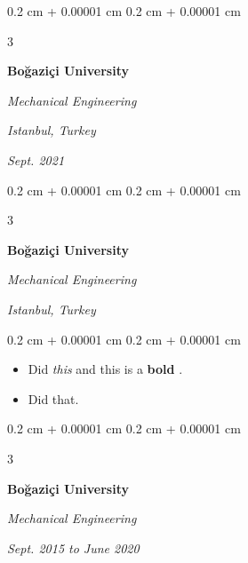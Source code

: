 \documentclass[10pt, letterpaper]{article}
\newenvironment{highlights}{
    \begin{itemize}[
        topsep=0.10 cm,
        parsep=0.10 cm,
        partopsep=0pt,
        itemsep=0pt,
        leftmargin=0.4 cm + 10pt + 0.6 cm
    ]
}{
    \end{itemize}
} %
\newenvironment{onecolentry}{
    \begin{adjustwidth}{
        0.2 cm + 0.00001 cm
    }{
        0.2 cm + 0.00001 cm
    }
}{
    \end{adjustwidth}
} %
\newenvironment{threecolentry}[3][]{
    \onecolentry
    \def\thirdColumn{#3}
    \setcolumnwidth{0.6 cm, \fill, 4.5 cm}
    \begin{paracol}{3}
    #2 \switchcolumn
}{
    \switchcolumn \raggedleft \thirdColumn
    \end{paracol}
    \endonecolentry
} %
\let\hrefWithoutArrow\href
\renewcommand{\href}[2]{\hrefWithoutArrow{#1}{\mbox{\ifthenelse{\equal{#2}{}}{ }{#2 }\raisebox{.15ex}{\footnotesize \faExternalLink*}}}}
\begin{document}
        \vspace{0.2 cm-3px}

        \begin{threecolentry}{
            \vspace*{\fill}
            \textbullet
            \vspace*{3px}
            \vspace*{\fill}
        }{
        \textit{Istanbul, Turkey}    
            
        \textit{Sept. 2021}}
            \textbf{Boğaziçi University}

            \textit{Mechanical Engineering}
        \end{threecolentry}



        \vspace{0.2 cm-3px}

        \begin{threecolentry}{
            \vspace*{\fill}
            \textbullet
            \vspace*{3px}
            \vspace*{\fill}
        }{
        \textit{Istanbul, Turkey}    
            
        }
            \textbf{Boğaziçi University}

            \textit{Mechanical Engineering}
        \end{threecolentry}

        \vspace{0.10 cm-3px}
        \begin{onecolentry}
            \begin{highlights}
                \item Did \textit{this} and this is a \textbf{bold} \href{https://example.com}{link}.
                \item Did that.
            \end{highlights}
        \end{onecolentry}


        \vspace{0.2 cm-3px}

        \begin{threecolentry}{
            \vspace*{\fill}
            \textbullet
            \vspace*{3px}
            \vspace*{\fill}
        }{
            
            
        \textit{Sept. 2015 to June 2020}}
            \textbf{Boğaziçi University}

            \textit{Mechanical Engineering}
        \end{threecolentry}
\end{document}
